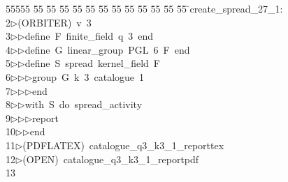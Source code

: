 %
%
\begin{tabbing}
55555 \= 55 \= 55 \= 55 \= 55 \= 55 \= 55 \= 55 \= 55 \= 55 \= 55 \= 55 \= 55 \= \>create\_spread\_27\_1:\\[0pt]
2\>$\triangleright$\>(ORBITER)\ v\ 3\ \\[0pt]
3\>$\triangleright$\>$\triangleright$\>define\ F\ finite\_field\ q\ 3\ end\ \\[0pt]
4\>$\triangleright$\>$\triangleright$\>define\ G\ linear\_group\ PGL\ 6\ F\ end\ \\[0pt]
5\>$\triangleright$\>$\triangleright$\>define\ S\ spread\ kernel\_field\ F\ \\[0pt]
6\>$\triangleright$\>$\triangleright$\>$\triangleright$\>group\ G\ k\ 3\ catalogue\ 1\ \\[0pt]
7\>$\triangleright$\>$\triangleright$\>$\triangleright$\>end\ \\[0pt]
8\>$\triangleright$\>$\triangleright$\>with\ S\ do\ spread\_activity\ \\[0pt]
9\>$\triangleright$\>$\triangleright$\>$\triangleright$\>report\ \\[0pt]
10\>$\triangleright$\>$\triangleright$\>end\\[0pt]
11\>$\triangleright$\>(PDFLATEX)\ catalogue\_q3\_k3\_1\_reporttex\\[0pt]
12\>$\triangleright$\>(OPEN)\ catalogue\_q3\_k3\_1\_reportpdf\\[0pt]
13\>\end{tabbing}
